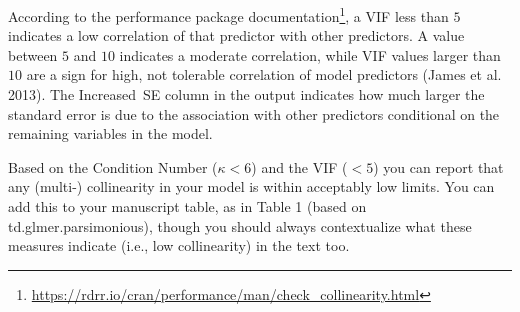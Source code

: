 \documentclass[
  10pt,
  letterpaper]{article}
\renewcommand\texttt[1]{{\ttfamily\color{BrickRed}#1}}
\DeclareRobustCommand{\href}[2]{#2\footnote{\url{#1}}}
\begin{document}
According to the
\href{https://rdrr.io/cran/performance/man/check_collinearity.html}{\texttt{performance}
package documentation}, a \texttt{VIF} less than \(5\) indicates a low
correlation of that predictor with other predictors. A value between
\(5\) and \(10\) indicates a moderate correlation, while VIF values
larger than \(10\) are a sign for high, not tolerable correlation of
model predictors (James et al. 2013). The \texttt{Increased\ SE} column
in the output indicates how much larger the standard error is due to the
association with other predictors conditional on the remaining variables
in the model.

Based on the Condition Number (\(\kappa<6\)) and the VIF (\(<5\)) you
can report that any (multi-) collinearity in your model is within
acceptably low limits. You can add this to your manuscript table, as in
Table 1 (based on \texttt{td.glmer.parsimonious}), though you should
always contextualize what these measures indicate (i.e., low
collinearity) in the text too.
\end{document}
